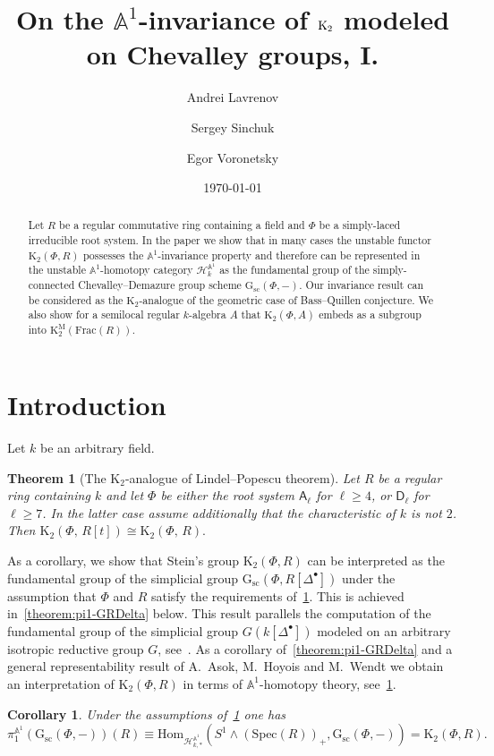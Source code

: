 \documentclass[oneside, 11pt]{amsart} \pdfoutput=1
\title{On the $\mathbb{A}^1$-invariance of $\K_2$ modeled on Chevalley groups, I.}
\author[1] {Andrei Lavrenov} \email{avlavrenov at gmail.com}
\author[2] {Sergey Sinchuk} \email{sinchukss at gmail.com}
\author[3] {Egor Voronetsky} \email{voronetckiiegor at yandex.ru}
\date {\today}
\newcommand{\K}{{\mathrm{K}}}
\newcommand{\Gsc}{\mathrm{G}_\mathrm{sc}}
\numberwithin{equation}{section}
\newtheorem{theorem}[lemma]{Theorem}
\newtheorem{corollary}[lemma]{Corollary}
\theoremstyle{definition}
\newcommand{\rA}{\mathsf{A}}
\newcommand{\rD}{\mathsf{D}}
\begin{document}
\begin{abstract}
 Let $R$ be a regular commutative ring containing a field and $\Phi$ be a simply-laced irreducible root system. In the paper we show that in many cases the unstable functor $\mathrm{K}_2(\Phi, R)$ possesses the $\mathbb{A}^1$-invariance property and therefore can be represented in the unstable $\mathbb{A}^1$-homotopy category $\mathcal{H}^{\mathbb{A}^1}_{k}$ as the fundamental group of the simply-connected Chevalley--Demazure group scheme $\mathrm{G}_\mathrm{sc}(\Phi,-)$. Our invariance result can be considered as the $\K_2$-analogue of the geometric case of Bass--Quillen conjecture. We also show for a semilocal regular $k$-algebra $A$ that $\K_2(\Phi, A)$ embeds as a subgroup into $\K^\mathrm{M}_2(\mathrm{Frac}(R))$.
\end{abstract}

\maketitle

\section{Introduction}
Let $k$ be an arbitrary field.
\begin{theorem}[The $\K_2$-analogue of Lindel--Popescu theorem] \label{theorem:LP-for-K2}
Let $R$ be a regular ring containing $k$  and let $\Phi$ be either the root system $\rA_\ell$ for $\ell\geq4$, or $\rD_\ell$ for $\ell\geq 7$. In the latter case assume additionally that the characteristic of $k$ is not $2$. Then $\K_2(\Phi,\,R[t])\cong\K_2(\Phi,\,R).$
\end{theorem}

As a corollary, we show that Stein's group $\K_2(\Phi, R)$ can be interpreted as the fundamental group of the simplicial group $\Gsc(\Phi, R[\Delta^\bullet])$ under the assumption that $\Phi$ and $R$ satisfy the requirements of~\cref{theorem:LP-for-K2}. This is achieved in~\cref{theorem:pi1-GRDelta} below. This result parallels the computation of the fundamental group of the simplicial group $G(k[\Delta^\bullet])$ modeled on an arbitrary isotropic reductive group $G$, see~\cite[Proposition~3.2]{VW16}. As a corollary of~\cref{theorem:pi1-GRDelta} and a general representability result of A.~Asok, M.~Hoyois and M.~Wendt we obtain an interpretation of $\K_2(\Phi, R)$ in terms of $\mathbb{A}^1$-homotopy theory, see~\cref{cor:motivic-pi1}.

\begin{corollary} \label{cor:motivic-pi1} Under the assumptions of~\cref{theorem:LP-for-K2} one has \[\pi_1^{\mathbb{A}^1}(\Gsc(\Phi, -))(R) \equiv \mathrm{Hom}_{\mathcal{H}^{\mathbb{A}^1}_{k,*}}(S^1 \wedge (\mathrm{Spec}(R))_+, \Gsc(\Phi, -)) = \K_2(\Phi, R).\]
\end{corollary}
\end{document}
